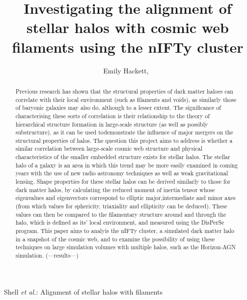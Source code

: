 \documentclass[journal]{IEEEtran}
\begin{document}
\title{Investigating the alignment of stellar halos with cosmic web filaments using the nIFTy cluster}

\author{Emily Hackett,~}%
	
%
{Shell \MakeLowercase{\textit{et al.}}: Alignment of stellar halos with filaments}

\maketitle

\begin{abstract}
	Previous research has shown that the structural properties of dark matter haloes can correlate with their local environment (such as filaments and voids), as similarly those of baryonic galaxies may also do, although to a lesser extent. The significance of characterising these sorts of correlation is their relationship to the theory of hierarchical structure formation in large-scale structure (as well as possibly substructure), as it can be used todemonstrate the influence of major mergers on the structural properties of halos. The question this project aims to address is whether a similar correlation between large-scale cosmic web structure and physical characteristics of the smaller embedded structure exists for stellar halos. The stellar halo of a galaxy is an area in which this trend may be more easily examined in coming years with the use of new radio astronomy techniques as well as weak gravitational lensing. Shape properties for these stellar halos can be derived similarly to those for dark matter halos, by calculating the reduced moment of inertia tensor whose eigenvalues and eigenvectors correspond to elliptic major,intermediate and minor axes (from which values for sphericity, triaxiality and ellipticity can be deduced). These values can then be compared to the filamentary structure around and through the halo, which is defined as its' local environment, and measured using the DisPerSe program. This paper aims to analyis the nIFTy cluster, a simulated dark matter halo in a snapshot of the cosmic web, and to examine the possibility of using these techniques on large simulation volumes with multiple halos, such as the Horizon-AGN simulation. 
	(---results---)
\end{abstract}
\end{document}
